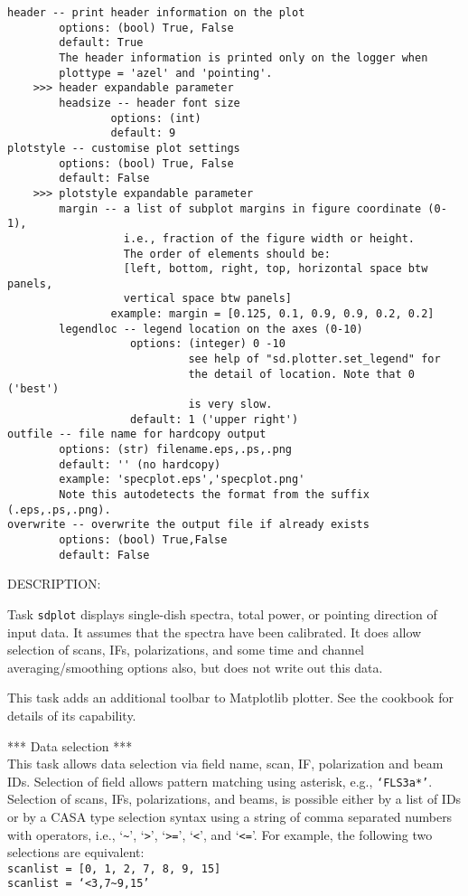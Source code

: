 \begin{verbatim}
header -- print header information on the plot
        options: (bool) True, False
        default: True
        The header information is printed only on the logger when 
        plottype = 'azel' and 'pointing'. 
    >>> header expandable parameter
        headsize -- header font size
                options: (int)
                default: 9
plotstyle -- customise plot settings
        options: (bool) True, False
        default: False
    >>> plotstyle expandable parameter
        margin -- a list of subplot margins in figure coordinate (0-1), 
                  i.e., fraction of the figure width or height.
                  The order of elements should be:
                  [left, bottom, right, top, horizontal space btw panels,
                  vertical space btw panels]
                example: margin = [0.125, 0.1, 0.9, 0.9, 0.2, 0.2]
        legendloc -- legend location on the axes (0-10)
                   options: (integer) 0 -10 
                            see help of "sd.plotter.set_legend" for 
                            the detail of location. Note that 0 ('best')
                            is very slow. 
                   default: 1 ('upper right')
outfile -- file name for hardcopy output
        options: (str) filename.eps,.ps,.png
        default: '' (no hardcopy)
        example: 'specplot.eps','specplot.png'
        Note this autodetects the format from the suffix (.eps,.ps,.png).
overwrite -- overwrite the output file if already exists
        options: (bool) True,False
        default: False
\end{verbatim}

DESCRIPTION:
    
Task {\tt sdplot} displays single-dish spectra, total power, or
pointing direction of input data.  It assumes that the spectra have
been calibrated.  It does allow selection of scans, IFs,
polarizations, and some time and channel averaging/smoothing options
also, but does not write out this data.

This task adds an additional toolbar to Matplotlib plotter. 
See the cookbook for details of its capability.

*** Data selection ***\\
This task allows data selection via field name, scan, IF, polarization
and beam IDs. Selection of field allows pattern matching using
asterisk, e.g., {\tt `FLS3a*'}. Selection of scans, IFs,
polarizations, and beams, is possible either by a list of IDs or by a
CASA type selection syntax using a string of comma separated numbers
with operators, i.e., `{\tt \~{}}', `{\tt >}', `{\tt >=}', `{\tt <}',
and `{\tt <=}'.
For example, the following two selections are equivalent:\\
{\tt scanlist = [0, 1, 2, 7, 8, 9, 15]}\\
{\tt scanlist = `<3,7\~{}9,15'}

